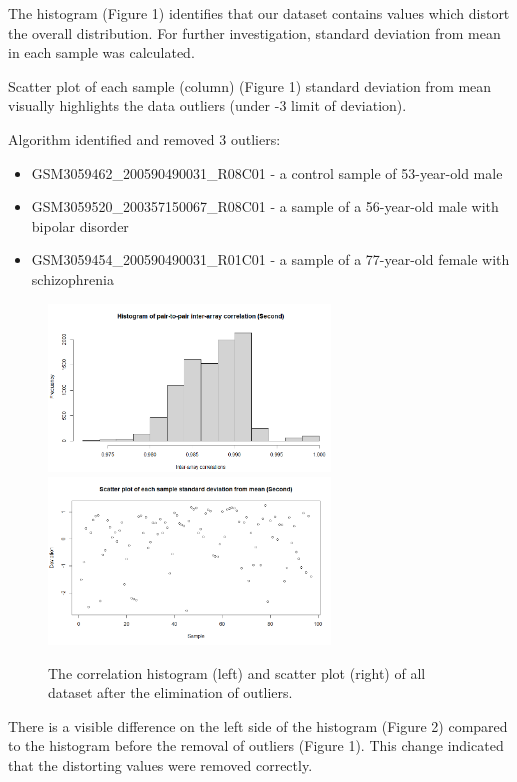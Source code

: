 \documentclass[
]{article}
\providecommand{\tightlist}{%
  \setlength{\itemsep}{0pt}\setlength{\parskip}{0pt}}
\begin{document}
The histogram (Figure 1) identifies that our dataset contains values
which distort the overall distribution. For further investigation,
standard deviation from mean in each sample was calculated.

Scatter plot of each sample (column) (Figure 1) standard deviation from
mean visually highlights the data outliers (under -3 limit of
deviation).

Algorithm identified and removed 3 outliers:

\begin{itemize}
\tightlist
\item
  GSM3059462\_200590490031\_R08C01 - a control sample of 53-year-old
  male
\item
  GSM3059520\_200357150067\_R08C01 - a sample of a 56-year-old male with
  bipolar disorder
\item
  GSM3059454\_200590490031\_R01C01 - a sample of a 77-year-old female
  with schizophrenia
\end{itemize}

\begin{figure}[!h]
  \begin{center}
    \includegraphics[width=75mm]{./3.png}
    \includegraphics[width=75mm]{./4.png}
    \caption{
      The correlation histogram (left) and scatter plot (right) of all dataset 
      after the elimination of outliers.
    }
  \end{center}
\end{figure}

There is a visible difference on the left side of the histogram (Figure
2) compared to the histogram before the removal of outliers (Figure 1).
This change indicated that the distorting values were removed correctly.
\end{document}

